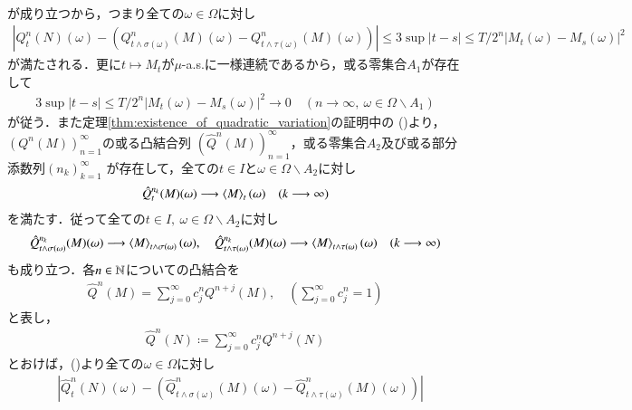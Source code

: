 \begin{prf}
\begin{description}
\begin{align}
				\end{align}
				が成り立つから，つまり全ての$\omega \in \Omega$に対し
				\begin{align}
					\left| Q^n_t(N)(\omega) - \left( Q^n_{t\wedge\sigma(\omega)}(M)(\omega) - Q^n_{t\wedge\tau(\omega)}(M)(\omega) \right) \right|
					\leq 3 \sup{|t - s| \leq T/2^n}{|M_t(\omega) - M_s(\omega)|^2}
					\label{eq:stopped_quadratic_variation_4}
				\end{align}
				が満たされる．更に$t \longmapsto M_t$が$\mu$-a.s.に一様連続であるから，或る零集合$A_1$が存在して
				\begin{align}
					3 \sup{|t - s| \leq T/2^n}{|M_t(\omega) - M_s(\omega)|^2}
					\longrightarrow 0 \quad (n \longrightarrow \infty,\ \omega \in \Omega \backslash A_1)
					\label{eq:stopped_quadratic_variation_5}
				\end{align}
				が従う．また定理\ref{thm:existence_of_quadratic_variation}の証明中の
				()より，$\left( Q^n(M) \right)_{n=1}^{\infty}$の或る凸結合列
				$\left( \hat{Q}^n(M) \right)_{n=1}^{\infty}$，或る零集合$A_2$及び或る部分添数列$(n_k)_{k=1}^{\infty}$
				が存在して，全ての$t \in I$と$\omega \in \Omega \backslash A_2$に対し
				\begin{align}
					\hat{Q}^{n_k}_t(M)(\omega) \longrightarrow \inprod<M>_t(\omega) \quad (k \longrightarrow \infty)
				\end{align}
				を満たす．従って全ての$t \in I,\ \omega \in \Omega \backslash A_2$に対し
				\begin{align}
					\hat{Q}^{n_k}_{t\wedge\sigma(\omega)}(M)(\omega) \longrightarrow \inprod<M>_{t\wedge\sigma(\omega)}(\omega),
					\quad \hat{Q}^{n_k}_{t\wedge\tau(\omega)}(M)(\omega) \longrightarrow \inprod<M>_{t\wedge\tau(\omega)}(\omega) 
					\quad (k \longrightarrow \infty)
					\label{eq:stopped_quadratic_variation_6}
				\end{align}
				も成り立つ．各$n \in \mathbb{N}$についての凸結合を
				\begin{align}
					\hat{Q}^n(M) = \sum_{j=0}^{\infty} c_j^n Q^{n+j}(M),
					\quad (\sum_{j=0}^{\infty} c_j^n = 1)
				\end{align}
				と表し，
				\begin{align}
					\hat{Q}^n(N) \coloneqq \sum_{j=0}^{\infty} c_j^n Q^{n+j}(N)
				\end{align}
				とおけば，()より全ての$\omega \in \Omega$に対し
				\begin{align}
					&\left| \hat{Q}^n_t(N)(\omega) - \left( \hat{Q}^n_{t\wedge\sigma(\omega)}(M)(\omega) - \hat{Q}^n_{t\wedge\tau(\omega)}(M)(\omega) \right) \right| \\

\end{align}
\end{description}
\end{prf}
